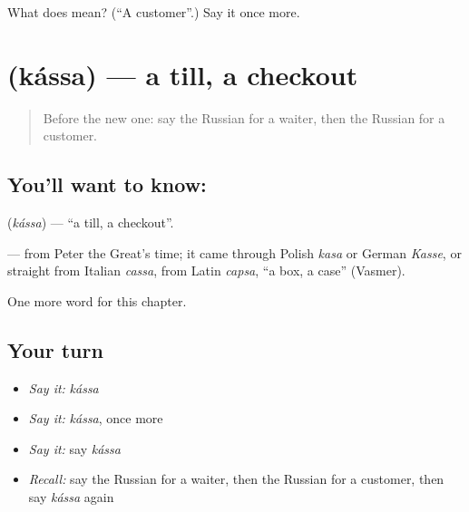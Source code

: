 \begin{tcolorbox}[breakable,colback=teal!4,colframe=teal!35!black,title={Before you move on}]
What does  mean? (\textquotedblleft{}A customer\textquotedblright{}.) Say it once more.
\end{tcolorbox}
\section[\texorpdfstring{\ru{касса} (kássa)}{касса (kássa)}]{ (kássa) — a till, a checkout}

\label{lesson:RU-C110-till}



\begin{quote}
Before the new one: say the Russian for a waiter, then the Russian for a customer.
\end{quote}

\subsection*{You'll want to know: }
\textbf{} (\emph{kássa}) — \textquotedblleft{}a till, a checkout\textquotedblright{}.

\begin{cousinweb}
\textbf{} — from Peter the Great's time; it came through Polish \emph{kasa} or German \emph{Kasse}, or straight from Italian \emph{cassa}, from Latin \emph{capsa}, \textquotedblleft{}a box, a case\textquotedblright{} (Vasmer).
\end{cousinweb}

\begin{grammarlens}[title={What you've built}]
One more word for this chapter.
\end{grammarlens}

\subsection*{Your turn}
\begin{itemize}
\raggedright
  \item \emph{Say it:} \emph{kássa}
  \item \emph{Say it:} \emph{kássa}, once more
  \item \emph{Say it:} say \emph{kássa}
  \item \emph{Recall:} say the Russian for a waiter, then the Russian for a customer, then say \emph{kássa} again
\end{itemize}

